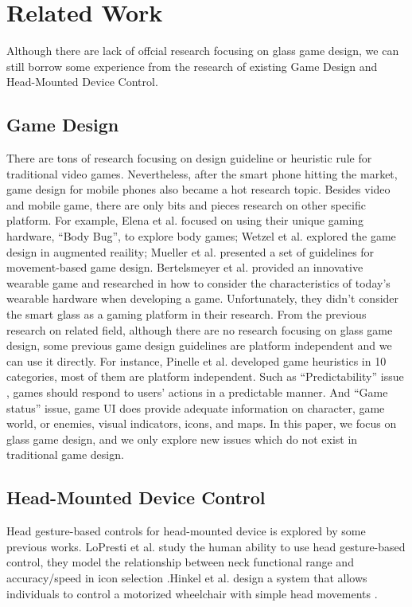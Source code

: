 \section{Related Work}

Although there are lack of offcial research focusing on glass game design, we can still borrow some experience from the research of existing Game Design and Head-Mounted Device Control.

\subsection{Game Design}

There are tons of research focusing on design guideline or heuristic rule for traditional video games\cite{gameflow,criticalreview,chi04game,09game,02game,08game,07game}. Nevertheless, after the smart phone hitting the market, game design for mobile phones also became a hot research topic\cite{mobilegame,mobile06,mobile08,icec06}. Besides video and mobile game, there are only bits and pieces research on other specific platform. For example, Elena et al. focused on using their unique gaming hardware, ``Body Bug'', to explore body games\cite{bodygame}; Wetzel et al. explored the game design in augmented reaility\cite{argame}; Mueller et al. presented a set of guidelines for movement-based game design\cite{movegame}. Bertelsmeyer et al. provided an innovative wearable game and researched in how to consider the characteristics of today's wearable hardware when developing a game\cite{wearable}. Unfortunately, they didn't consider the smart glass as a gaming platform in their research. 
From the previous research on related field, although there are no research focusing on glass game design, some previous game design guidelines are platform independent and we can use it directly. For instance, Pinelle et al.\cite{videogame} developed game heuristics in 10 categories, most of them are platform independent. 
Such as ``Predictability'' issue , games should respond to users' actions in a predictable manner. And ``Game status'' issue, game UI does provide adequate information on character, game world, or enemies, visual indicators, icons, and maps. 
In this paper, we focus on glass game design, and we only explore new issues which do not exist in traditional game design.


\subsection{Head-Mounted Device Control}
Head gesture-based controls for head-mounted device is explored by some previous works. LoPresti et al. study the human ability to use head gesture-based control, they model the relationship between neck functional range and accuracy/speed in icon selection \cite{neck}.Hinkel et al. design a system that allows individuals to control a motorized wheelchair with simple head movements \cite{wheel}.
